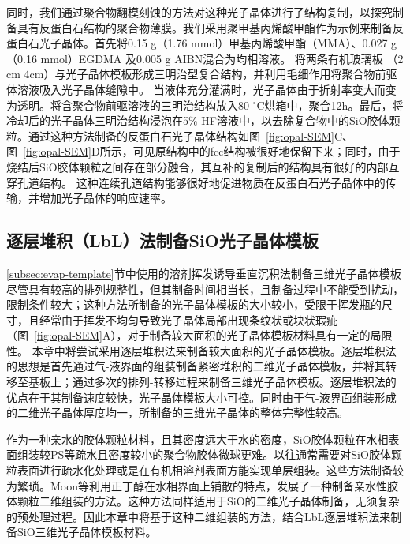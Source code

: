 同时，我们通过聚合物翻模刻蚀的方法对这种光子晶体进行了结构复制，以探究制备具有反蛋白石结构的聚合物薄膜。我们采用聚甲基丙烯酸甲酯作为示例来制备反蛋白石光子晶体。首先将0.15 g（1.76 mmol）甲基丙烯酸甲酯（MMA）、0.027 g（0.16 mmol）EGDMA 及0.005 g AIBN混合为均相溶液。
将两条有机玻璃板 （2 cm \text{$\times$} 4cm）与光子晶体模板形成三明治型复合结构，并利用毛细作用将聚合物前驱体溶液吸入光子晶体缝隙中。
当液体充分灌满时，光子晶体由于折射率变大而变为透明。将含聚合物前驱溶液的三明治结构放入80 $^{\circ}$C烘箱中，聚合12h。最后，将冷却后的光子晶体三明治结构浸泡在5\% HF溶液中，以去除复合物中的SiO胶体颗粒。通过这种方法制备的反蛋白石光子晶体结构如图~\ref{fig:opal-SEM}C、图~\ref{fig:opal-SEM}D所示，可见原结构中的fcc结构被很好地保留下来；同时，由于烧结后SiO胶体颗粒之间存在部分融合，其互补的复制后的结构具有很好的内部互穿孔道结构。
这种连续孔道结构能够很好地促进物质在反蛋白石光子晶体中的传输，并增加光子晶体的响应速率。

\subsection{逐层堆积（LbL）法制备SiO光子晶体模板}
\label{subsec:lbl-opal}

\ref{subsec:evap-template}节中使用的溶剂挥发诱导垂直沉积法制备三维光子晶体模板尽管具有较高的排列规整性，但其制备时间相当长，且制备过程中不能受到扰动，限制条件较大；这种方法所制备的光子晶体模板的大小较小，受限于挥发瓶的尺寸，且经常由于挥发不均匀导致光子晶体局部出现条纹状或块状瑕疵（图~\ref{fig:opal-SEM}A），对于制备较大面积的光子晶体模板材料具有一定的局限性。
本章中将尝试采用逐层堆积法来制备较大面积的光子晶体模板。逐层堆积法的思想是首先通过气-液界面的组装制备紧密堆积的二维光子晶体模板，并将其转移至基板上；通过多次的排列-转移过程来制备三维光子晶体模板。逐层堆积法的优点在于其制备速度较快，光子晶体模板大小可控。同时由于气-液界面组装形成的二维光子晶体厚度均一，所制备的三维光子晶体的整体完整性较高。

作为一种亲水的胶体颗粒材料，且其密度远大于水的密度，SiO胶体颗粒在水相表面组装较PS等疏水且密度较小的聚合物胶体微球更难。以往通常需要对SiO胶体颗粒表面进行疏水化处理或是在有机相溶剂表面方能实现单层组装\cite{Velikov2002LayerByLayer,Chitu2010Modified}。这些方法制备较为繁琐。Moon等利用正丁醇在水相界面上铺散的特点，发展了一种制备亲水性胶体颗粒二维组装的方法\cite{Moon2011Assembled}。这种方法同样适用于SiO的二维光子晶体制备，无须复杂的预处理过程。因此本章中将基于这种二维组装的方法，结合LbL逐层堆积法来制备SiO三维光子晶体模板材料。

